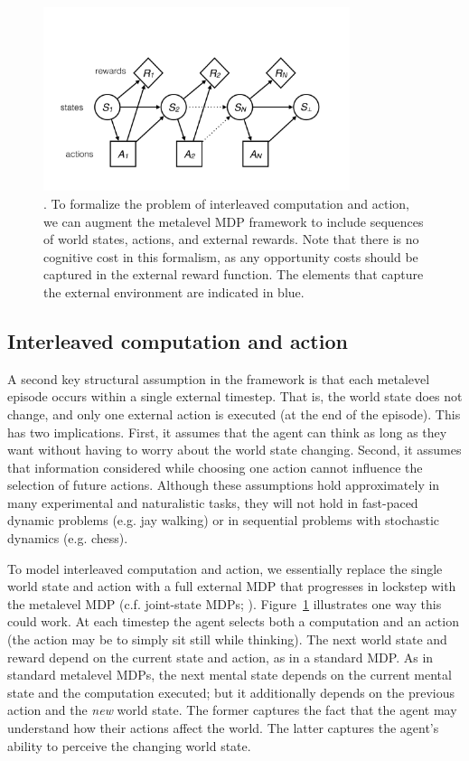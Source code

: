 \begin{figure}
  \centering
  \includegraphics[width=0.8\textwidth,page=3,trim=0 50 0 50]{diagrams/metamdp.pdf}
  \caption{. To formalize the problem of interleaved computation and action, we can augment the metalevel MDP framework to include sequences of world states, actions, and external rewards. Note that there is no cognitive cost in this formalism, as any opportunity costs should be captured in the external reward function. The elements that capture the external environment are indicated in blue.
  }
  \label{fig:metamdp-joint}
\end{figure}

\subsection{Interleaved computation and action}

A second key structural assumption in the framework is that each metalevel episode occurs within a single external timestep. That is, the world state does not change, and only one external action is executed (at the end of the episode). This has two implications. First, it assumes that the agent can think as long as they want without having to worry about the world state changing. Second, it assumes that information considered while choosing one action cannot influence the selection of future actions. Although these assumptions hold approximately in many experimental and naturalistic tasks, they will not hold in fast-paced dynamic problems (e.g. jay walking) or in sequential problems with stochastic dynamics (e.g. chess).

To model interleaved computation and action, we essentially replace the single world state and action with a full external MDP that progresses in lockstep with the metalevel MDP (c.f. joint-state MDPs; \citealp{russell1991right,parr1998reinforcement,hay2016principles}). Figure~\ref{fig:metamdp-joint} illustrates one way this could work. At each timestep the agent selects both a computation and an action (the action may be to simply sit still while thinking). The next world state and reward depend on the current state and action, as in a standard MDP. As in standard metalevel MDPs, the next mental state depends on the current mental state and the computation executed; but it additionally depends on the previous action and the \emph{new} world state. The former captures the fact that the agent may understand how their actions affect the world. The latter captures the agent's ability to perceive the changing world state.

